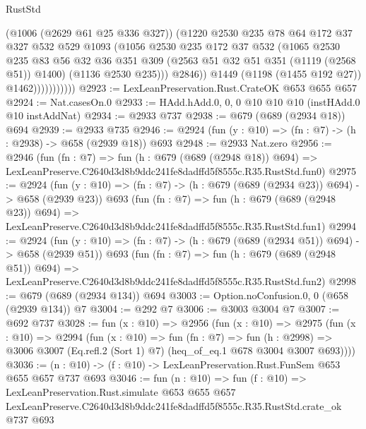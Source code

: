 \begin{lexlean}{RustStd}
\begin{coremodule}
                            (@1006 (@2629 @61 @25 @336 @327))
                            (@1220
                              @2530
                              @235
                              @78
                              @64
                              @172
                              @37
                              @327
                              @532
                              @529
                              @1093
                              (@1056
                                @2530
                                @235
                                @172
                                @37
                                @532
                                (@1065
                                  @2530
                                  @235
                                  @83
                                  @56
                                  @32
                                  @36
                                  @351
                                  @309
                                  (@2563 @51 @32 @51 @351 (@1119 (@2568 @51)) @1400)
                                  (@1136 @2530 @235)))
                              @2846))
                          @1449
                          (@1198 (@1455 @192 @27))
                          @1462)))))))))))
@2923 := LexLeanPreservation.Rust.CrateOK @653 @655 @657
@2924 := Nat.casesOn.{0}
@2933 := HAdd.hAdd.{0, 0, 0} @10 @10 @10 (instHAdd.{0} @10 instAddNat)
@2934 := @2933 @737
@2938 := @679 (@689 (@2934 @18)) @694
@2939 := @2933 @735
@2946 := @2924 (fun (y : @10) => (fn : @7) -> (h : @2938) -> @658 (@2939 @18)) @693
@2948 := @2933 Nat.zero
@2956 := @2946
    (fun (fn : @7) =>
    fun (h : @679 (@689 (@2948 @18)) @694) =>
    LexLeanPreserve.C2640d3d8b9ddc241fe8dadffd5f8555c.R35.RustStd.fun0)
@2975 := @2924
    (fun (y : @10) => (fn : @7) -> (h : @679 (@689 (@2934 @23)) @694) -> @658 (@2939 @23))
    @693
    (fun (fn : @7) =>
    fun (h : @679 (@689 (@2948 @23)) @694) =>
    LexLeanPreserve.C2640d3d8b9ddc241fe8dadffd5f8555c.R35.RustStd.fun1)
@2994 := @2924
    (fun (y : @10) => (fn : @7) -> (h : @679 (@689 (@2934 @51)) @694) -> @658 (@2939 @51))
    @693
    (fun (fn : @7) =>
    fun (h : @679 (@689 (@2948 @51)) @694) =>
    LexLeanPreserve.C2640d3d8b9ddc241fe8dadffd5f8555c.R35.RustStd.fun2)
@2998 := @679 (@689 (@2934 @134)) @694
@3003 := Option.noConfusion.{0, 0} (@658 (@2939 @134)) @7
@3004 := @292 @7
@3006 := @3003 @3004 @7
@3007 := @692 @737
@3028 := fun (x : @10) =>
  @2956
    (fun (x : @10) =>
    @2975
      (fun (x : @10) =>
      @2994
        (fun (x : @10) =>
        fun (fn : @7) =>
        fun (h : @2998) =>
        @3006 @3007 (Eq.refl.{2} (Sort 1) @7) (heq_of_eq.{1} @678 @3004 @3007 @693))))
@3036 := (n : @10) -> (f : @10) -> LexLeanPreservation.Rust.FunSem @653 @655 @657 @737 @693
@3046 := fun (n : @10) =>
  fun (f : @10) =>
  LexLeanPreservation.Rust.simulate
    @653
    @655
    @657
    LexLeanPreserve.C2640d3d8b9ddc241fe8dadffd5f8555c.R35.RustStd.crate_ok
    @737
    @693
\end{coremodule}
\end{lexlean}
